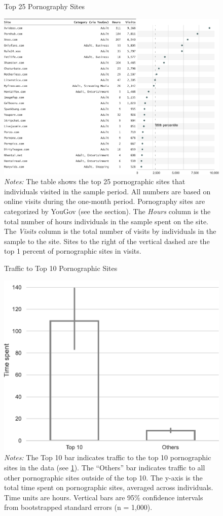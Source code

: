 \documentclass[12pt,twoside]{article}
\begin{document}
\begin{figure}[ht]
	\centering
	\caption{Top 25 Pornography Sites}
	\includegraphics[width=\textwidth]{figs/top_25_adultsites.pdf}
	\caption*{\footnotesize \emph{Notes:} 
		The table shows the top 25 pornographic sites that individuals visited in the sample period.
            All numbers are based on online visits during the one-month period.
		Pornography sites are categorized by YouGov (see the  section).
    	The \emph{Hours} column is the total number of hours individuals in the sample spent on the site. 
    	The \emph{Visits} column is the total number of visits by individuals in the sample to the site.
            Sites to the right of the vertical dashed are the top 1 percent of pornographic sites in visits.
	}
	\label{fig:top25_adult}
\end{figure}



\begin{figure}
	\centering
	\caption{Traffic to Top 10 Pornographic Sites}
	\includegraphics[width=.5\textwidth]{figs/concentration_porn_consumption.pdf}
	\caption*{\footnotesize \emph{Notes:} 
		The Top 10 bar indicates traffic to the top 10 pornographic sites in the data (see \cref{fig:top25_adult}).
		The ``Others'' bar indicates traffic to all other pornographic sites outside of the top 10.
		The y-axis is the total time spent on pornographic sites, averaged across individuals.
		Time units are hours.
		Vertical bars are 95\% confidence intervals from bootstrapped standard errors (n = 1,000).
	}
	\label{fig:concentration_porn_consumption}
\end{figure}
\end{document}
